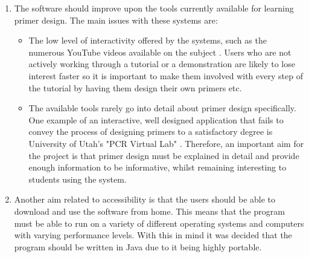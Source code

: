 \begin {enumerate}
\item The software should improve upon the tools currently available for learning primer design. The main issues with these systems are: 

\begin {itemize}
\item The low level of interactivity offered by the systems, such as the numerous YouTube videos available on the subject \citep{youtube:taqExtension}. Users who are not actively working through a tutorial or a demonstration are likely to lose interest faster so it is important to make them involved with every step of the tutorial by having them design their own primers etc.
\item The available tools rarely go into detail about primer design specifically. One example of an interactive, well designed application that fails to convey the process of designing primers to a satisfactory degree is University of Utah's "PCR Virtual Lab" \citep{genScienceCenter2012}. Therefore, an important aim for the project is that primer design must be explained in detail and provide enough information to be informative, whilst remaining interesting to students using the system.
\end {itemize}

\item Another aim related to accessibility is that the users should be able to download and use the software from home. This means that the program must be able to run on a variety of different operating systems and computers with varying performance levels. With this in mind it was decided that the program should be written in Java due to it being highly portable.
\end {enumerate}
